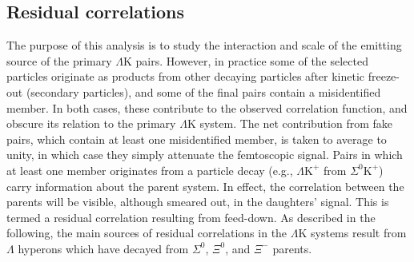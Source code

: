 \documentclass[ALICE,manyauthors]{cernphprep}
\newcommand{\Lam}{$\Lambda$\xspace}
\newcommand{\KchP}{$\mathrm{K^{+}}$\xspace}
\newcommand{\LamK}{$\Lambda$K\xspace}
\newcommand{\LamKchP}{$\Lambda\mathrm{K^{+}}$\xspace}
\begin{document}
\subsection{Residual correlations}
\label{ResidualCorrelations}

The purpose of this analysis is to study the interaction and scale of the emitting source of the primary \LamK pairs.
However, in practice some of the selected particles originate as products from other decaying particles after kinetic freeze-out (secondary particles), and some of the final pairs contain a misidentified member.
In both cases, these contribute to the observed correlation function, and obscure its relation to the primary \LamK system.
The net contribution from fake pairs, which contain at least one misidentified member, is taken to average to unity, in which case they simply attenuate the femtoscopic signal.
Pairs in which at least one member originates from a particle decay (e.g., \LamKchP from $\Sigma^{0}$\KchP) carry information about the parent system.
In effect, the correlation between the parents will be visible, although smeared out, in the daughters' signal.
This is termed a residual correlation resulting from feed-down.  
As described in the following, the main sources of residual correlations in the \LamK systems result from \Lam hyperons which have decayed from $\Sigma^{0}$, $\Xi^{0}$, and $\Xi^{-}$ parents. 
\end{document}
